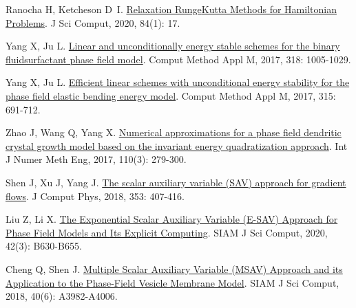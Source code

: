 \begin{thebibliography}{79}
    Ranocha H, Ketcheson D~I.
    \newblock \href{https://link.springer.com/10.1007/s10915-020-01277-y}{Relaxation {{Runge}}{\textendash}{{Kutta Methods}} for {{Hamiltonian Problems}}}\allowbreak[J].
    \newblock J Sci Comput, 2020, 84\allowbreak (1): 17.
    
    Yang X, Ju L.
    \newblock \href{https://www.sciencedirect.com/science/article/pii/S0045782516317856}{Linear and unconditionally energy stable schemes for the binary fluid{\textendash}surfactant phase field model}\allowbreak[J].
    \newblock Comput Method Appl M, 2017, 318: 1005-1029.
    
    Yang X, Ju L.
    \newblock \href{https://www.sciencedirect.com/science/article/pii/S0045782516306016}{Efficient linear schemes with unconditional energy stability for the phase field elastic bending energy model}\allowbreak[J].
    \newblock Comput Method Appl M, 2017, 315: 691-712.
    
    Zhao J, Wang Q, Yang X.
    \newblock \href{https://onlinelibrary.wiley.com/doi/abs/10.1002/nme.5372}{Numerical approximations for a phase field dendritic crystal growth model based on the invariant energy quadratization approach}\allowbreak[J].
    \newblock Int J Numer Meth Eng, 2017, 110\allowbreak (3): 279-300.
    
    Shen J, Xu J, Yang J.
    \newblock \href{https://www.sciencedirect.com/science/article/pii/S002199911730774X}{The scalar auxiliary variable ({{SAV}}) approach for gradient flows}\allowbreak[J].
    \newblock J Comput Phys, 2018, 353: 407-416.
    
    Liu Z, Li X.
    \newblock \href{https://epubs.siam.org/doi/10.1137/19M1305914}{The {{Exponential Scalar Auxiliary Variable}} ({{E-SAV}}) {{Approach}} for {{Phase Field Models}} and {{Its Explicit Computing}}}\allowbreak[J].
    \newblock SIAM J Sci Comput, 2020, 42\allowbreak (3): B630-B655.
    
    Cheng Q, Shen J.
    \newblock \href{https://epubs.siam.org/doi/10.1137/18M1166961}{Multiple {{Scalar Auxiliary Variable}} ({{MSAV}}) {{Approach}} and its {{Application}} to the {{Phase-Field Vesicle Membrane Model}}}\allowbreak[J].
    \newblock SIAM J Sci Comput, 2018, 40\allowbreak (6): A3982-A4006.
    

\end{thebibliography}
